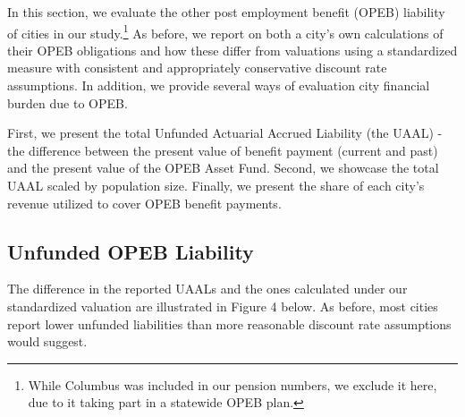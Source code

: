 \documentclass[12pt]{article}
\begin{document}
In this section, we evaluate the other post employment benefit (OPEB)
liability of cities in our study.\footnote{While Columbus was included in our pension numbers, we exclude it here, due to it taking part in a statewide OPEB plan.} As before, we report on both a city's
own calculations of their OPEB obligations and how these differ from
valuations using a standardized measure with consistent and appropriately conservative discount rate
assumptions. In addition, we provide several ways of evaluation city
financial burden due to OPEB.

First, we present the total Unfunded Actuarial Accrued Liability
(the UAAL) - the difference between the present value of benefit payment
(current and past) and the present value of the OPEB Asset Fund. Second,
we showcase the total UAAL scaled by population size. Finally, we
present the share of each city's revenue utilized to cover OPEB benefit
payments.


\subsection{Unfunded OPEB
Liability}

The difference in the reported UAALs and the ones calculated under our
standardized valuation are illustrated in Figure 4 below. As before,
most cities report lower unfunded liabilities than more reasonable
discount rate assumptions would suggest.

\begin{figure}
  \label{fig:key}
\end{figure}
\end{document}
